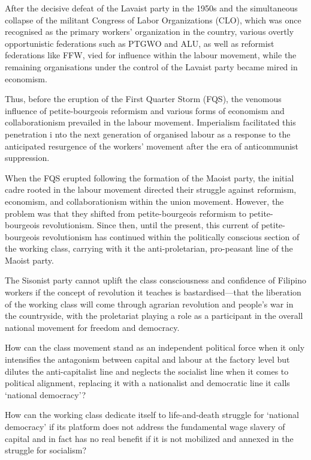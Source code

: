 After the decisive defeat of the Lavaist party in the 1950s 
and the simultaneous collapse 
of the militant Congress of Labor Organizations (CLO), 
which was once recognised as the primary workers' organization in the country, 
various overtly opportunistic federations 
such as PTGWO and ALU, 
as well as reformist federations like FFW, 
vied for influence within the labour movement, 
while the remaining organisations
under the control of the Lavaist party 
became mired in economism.

Thus, 
before the eruption of the First Quarter Storm (FQS), 
the venomous influence of petite-bourgeois reformism 
and various forms of economism and collaborationism 
prevailed in the labour movement. 
Imperialism facilitated this penetration i
nto the next generation of organised labour 
as a response to the anticipated resurgence 
of the workers' movement after the era of anticommunist suppression.

When the FQS erupted following the formation of the Maoist party, 
the initial cadre rooted in the labour movement 
directed their struggle against reformism, economism, and collaborationism 
within the union movement. 
However, 
the problem was that they shifted from petite-bourgeois reformism 
to petite-bourgeois revolutionism. 
Since then, until the present, 
this current of petite-bourgeois revolutionism 
has continued within the politically conscious section of the working class, 
carrying with it the anti-proletarian, pro-peasant line of the Maoist party.

The Sisonist party cannot uplift the class consciousness 
and confidence of Filipino workers 
if the concept of revolution it teaches is bastardised---that 
the liberation of the working class will come 
through agrarian revolution and people's war in the countryside, 
with the proletariat playing a role as a participant 
in the overall national movement for freedom and democracy.

How can the class movement stand 
as an independent political force 
when it only intensifies the antagonism 
between capital and labour at the factory level 
but dilutes the anti-capitalist line 
and neglects the socialist line 
when it comes to political alignment, 
replacing it with a nationalist and democratic line 
it calls `national democracy'?

How can the working class dedicate itself 
to life-and-death struggle for `national democracy' 
if its platform does not address 
the fundamental wage slavery of capital 
and in fact has no real benefit 
if it is not mobilized and annexed 
in the struggle for socialism?

